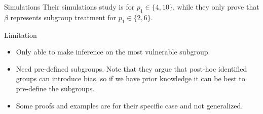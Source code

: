 \documentclass{beamer}\usepackage{listings}
\begin{document}
\begin{frame}[label={sec:orgc516480}]{Simulations}
Their simulations study is for \(p_1\in\{4,10\}\), while they only prove that \(\beta\)
represents subgroup treatment for \(p_1\in\{2,6\}\).
\end{frame}


\begin{frame}[label={sec:org4b9a807}]{Limitation}
\begin{itemize}
\item Only able to make inference on the most vulnerable subgroup.
\item Need pre-defined subgroups. Note that they argue that post-hoc identified groups can introduce
bias, so if we have prior knowledge it can be best to pre-define the subgroups.
\item Some proofs and examples are for their specific case and not generalized.
\end{itemize}
\end{frame}
\end{document}
